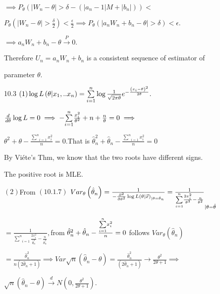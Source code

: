 \documentclass{article}
\begin{document}
$\implies P_{\theta }\left( \left\vert W_{n}-\theta \right\vert >\delta
-\left( \left\vert a_{n}-1\right\vert M+\left\vert b_{n}\right\vert \right)
\right) <$

$P_{\theta }\left( \left\vert W_{n}-\theta \right\vert >\frac{\delta }{2}%
\right) <\frac{\epsilon }{2}\implies P_{\theta }\left( \left\vert
a_{n}W_{n}+b_{n}-\theta \right\vert >\delta \right) <\epsilon .$

$\implies a_{n}W_{n}+b_{n}-\theta \overset{P}{\rightarrow }0.$

Therefore $U_{n}=a_{n}W_{n}+b_{n}$ is a consistent sequence of estimator of 

parameter $\theta .$

10.3 $\left( 1\right) \log L\left( \theta |x_{1},..x_{n}\right) =\underset{%
i=1}{\overset{n}{\sum }}\log \frac{1}{\sqrt{2\pi \theta }}e^{-\frac{\left(
x_{i}-\theta \right) ^{2}}{2\theta }}.$

$\frac{d}{d\theta }\log L=0\implies -\underset{i=1}{\overset{n}{\sum }}\frac{%
x_{i}^{2}}{\theta ^{2}}+n+\frac{n}{\theta }=0\implies $

$\theta ^{2}+\theta -\frac{\underset{i=1}{\overset{n}{\sum }}x_{i}^{2}}{n}=0.
$That is $\hat{\theta}_{n}^{2}+\hat{\theta}_{n}-\frac{\underset{i=1}{\overset%
{n}{\sum }}x_{i}^{2}}{n}=0$

By Vi\'{e}te's Thm, we know that the two roots have different signs.

The positive root is MLE.

$\left( 2\right) $From $\left( 10.1.7\right) $ $Var_{\theta }\left( \hat{%
\theta}_{n}\right) =\frac{1}{-\frac{\partial ^{2}}{\partial \theta ^{2}}\log
L\left( \theta |\vec{x}\right) _{|\theta =\hat{\theta}_{n}}}=\frac{1}{%
\underset{i=1}{\overset{n}{\sum }}\frac{2x_{i}^{2}}{\theta ^{3}}-\frac{n}{%
\theta ^{2}}}_{|\theta =\hat{\theta}}$

$=\frac{1}{\underset{i=1}{\overset{n}{\sum }}\frac{2x_{i}^{2}}{\hat{\theta}%
_{n}^{3}}-\frac{n}{\hat{\theta}_{n}^{2}}},$from $\hat{\theta}_{n}^{2}+\hat{%
\theta}_{n}-\frac{\underset{i=1}{\overset{n}{\sum }}x_{i}^{2}}{n}=0$ follows 
$Var_{\theta }\left( \hat{\theta}_{n}\right) $

$=\frac{\hat{\theta}_{n}^{2}}{n\left( 2\hat{\theta}_{n}+1\right) }\implies
Var\sqrt{n}\left( \hat{\theta}_{n}-\theta \right) =\frac{\hat{\theta}_{n}^{2}%
}{\left( 2\hat{\theta}_{n}+1\right) }\rightarrow \frac{\theta ^{2}}{2\theta
+1}\implies $

$\sqrt{n}\left( \hat{\theta}_{n}-\theta \right) \overset{d}{\rightarrow }%
N\left( 0,\frac{\theta ^{2}}{2\theta +1}\right) .$
\end{document}
